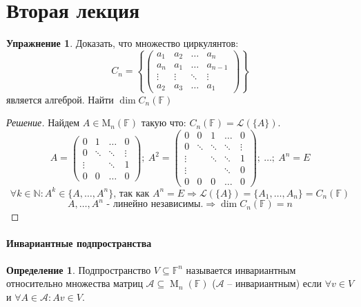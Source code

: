 \documentclass[a4paper, 14pt]{extarticle}
\theoremstyle{definition}
\newtheorem{definition}{Определение}
\newtheorem{exec}{Упражнение}
\begin{document}
\newpage

\section{Вторая лекция}

\begin{exec}
	Доказать, что множество циркулянтов:
	\[C_n = \left\{
		\left(
			\begin{array}{cccc}
				a_1&a_2&\hdots&a_n\\
				a_n&a_1&\hdots&a_{n-1}\\
				\vdots&\vdots&\ddots&\vdots\\
				a_{2}&a_3&\hdots&a_1
			\end{array}
		\right)
	\right\}\]
	является алгеброй. Найти \(\operatorname{dim} C_n(\mathbb{F})\)
\end{exec}

\begin{proof}[Решение]
	Найдем \(A \in \text{M}_n(\mathbb{F})\) такую что:
	\(C_n(\mathbb{F}) = \mathcal{L}(\{A\})\).
	\[A = \left(
		\begin{array}{cccc}
			0&1&\hdots&0\\
			0&\ddots&\ddots&\vdots\\
			\vdots&&\ddots&1\\
			0&0&\hdots&0
		\end{array}
	\right);\ A^2 = \left(
		\begin{array}{ccccc}
			0&0&1&\hdots&0\\
			0&\ddots&\ddots&\ddots&\vdots\\
			\vdots&&\ddots&\ddots&1\\
			\vdots&&&\ddots&0\\
			0&0&0&\hdots&0
		\end{array}
	\right);\ \dots;\ A^n = E \]
	\[\forall k \in \mathbb{N} : A^k \in \{A, \dots, A^n\} \text{, так как } A^n = E \Rightarrow \mathcal{L}(\{A\}) = \{A_1, \dots, A_n\} = C_n(\mathbb{F})\]
	\[A, \dots, A^n \text{ - линейно независимы.} \Rightarrow \operatorname{dim} C_n(\mathbb{F}) = n\]
\end{proof}

\paragraph{Инвариантные подпространства}

\begin{definition}
	Подпространство \(V \subseteq \mathbb{F}^n\) называется инвариантным относительно множества матриц \(\mathcal{A} \subseteq \operatorname{M}_n(\mathbb{F})\) (\(\mathcal{A}\) -- инвариантным) если \(\forall v \in V\) и \(\forall A \in \mathcal{A}: Av \in V\).
\end{definition}
\end{document}
